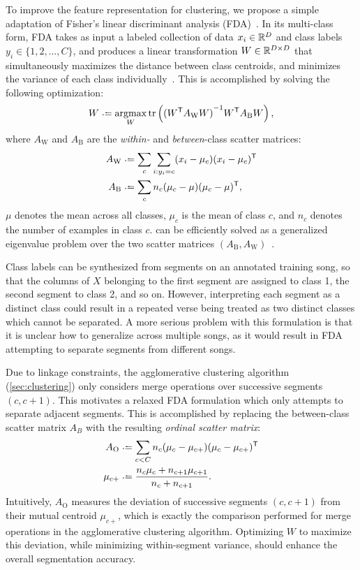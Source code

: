 \documentclass{article}
\begin{document}
\label{sec:olda}
To improve the feature representation for clustering, we propose a simple adaptation of Fisher's linear discriminant
analysis (FDA)~\cite{fisher1936use}.  In its multi-class form, FDA takes as input a labeled collection of data $x_i \in \mathbb{R}^D$
and class labels $y_i \in \{1,2,\ldots, C\}$, and produces a linear transformation $W \in \mathbb{R}^{D\times D}$ that simultaneously 
maximizes the distance between class centroids, and minimizes the variance of each class 
individually~\cite{fukunaga1990introduction}. This is accomplished by solving the following optimization:
\begin{equation}
W \defeq \argmax_W \trace\left( {(W\trans A_\text{W} W)}^{-1} W\trans A_\text{B} W \right) \label{eq:fda},
\end{equation}
where $A_\text{W}$ and $A_\text{B}$ are the \emph{within-} and \emph{between}-class scatter matrices:
\begin{align*}
A_\text{W} & \defeq \sum_c \sum_{i : y_i = c} (x_i - \mu_c)(x_i - \mu_c)\trans\\
A_\text{B} & \defeq \sum_c n_c (\mu_c - \mu)(\mu_c - \mu)\trans,
\end{align*}
$\mu$ denotes the mean across all classes, $\mu_c$ is the mean of class $c$, and $n_c$ denotes the number of examples in class $c$.
 can be efficiently solved as a generalized eigenvalue problem over the two scatter matrices $(A_\text{B},
A_\text{W})$~\cite{de2005eigenproblems}.

Class labels can be synthesized from segments on an annotated training song, so that the columns of $X$ belonging to the first 
segment are assigned to class 1, the second segment to class 2, and so on.
However, interpreting each segment as a distinct class could result in a repeated verse being treated as two distinct classes which 
cannot be separated. 
A more serious problem with this formulation is that it is unclear how to generalize across multiple songs, as it would result in
FDA attempting to separate segments from different songs.%

Due to linkage constraints, the agglomerative clustering algorithm (\cref{sec:clustering}) only considers merge 
operations over successive segments $(c, c+1)$. This motivates a relaxed FDA formulation which only attempts to separate adjacent
segments.  This is accomplished by replacing the between-class scatter matrix $A_B$ with the resulting \emph{ordinal scatter matrix}:
\begin{align*}
A_\text{O} &\defeq \sum_{c < C} n_c (\mu_c - \mu_{c+}) (\mu_c - \mu_{c+})\trans\\
\mu_{c+} &\defeq \frac{n_c \mu_c + n_{c+1} \mu_{c+1} }{n_c + n_{c+1}}.
\end{align*}
Intuitively, $A_\text{O}$ measures the deviation of successive segments $(c, c+1)$ from their mutual centroid $\mu_{c+}$, 
which is exactly the comparison performed for merge operations in the agglomerative clustering algorithm.
Optimizing $W$ to maximize this deviation, while minimizing within-segment variance, should enhance the overall segmentation accuracy.  
\end{document}
